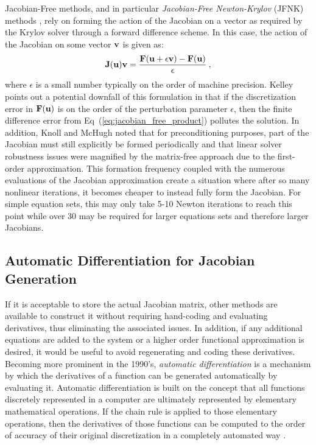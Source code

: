 Jacobian-Free methods, and in particular \textit{Jacobian-Free
  Newton-Krylov} (JFNK) methods \citep{knoll_jacobian-free_2004}, rely
on forming the action of the Jacobian on a vector as required by the
Krylov solver through a forward difference scheme. In this case, the
action of the Jacobian on some vector $\mathbf{v}$ is given as:
\begin{equation}
  \mathbf{J}(\mathbf{u})\mathbf{v} = \frac{\mathbf{F}(\mathbf{u} + \epsilon \mathbf{v}) -
    \mathbf{F}(\mathbf{u})}{\epsilon}\:,
  \label{eq:jacobian_free_product}
\end{equation}
where $\epsilon$ is a small number typically on the order of machine
precision. Kelley \citep{kelley_iterative_1995} points out a potential
downfall of this formulation in that if the discretization error in
$\mathbf{F}(\mathbf{u})$ is on the order of the perturbation parameter
$\epsilon$, then the finite difference error from
Eq~(\ref{eq:jacobian_free_product}) pollutes the solution. In
addition, Knoll and McHugh noted that for preconditioning purposes,
part of the Jacobian must still explicitly be formed periodically and
that linear solver robustness issues were magnified by the matrix-free
approach due to the first-order approximation. This formation
frequency coupled with the numerous evaluations of the Jacobian
approximation create a situation where after so many nonlinear
iterations, it becomes cheaper to instead fully form the
Jacobian. For simple equation sets, this may only take 5-10 Newton
iterations to reach this point while over 30 may be required for
larger equations sets and therefore larger Jacobians.

\subsection{Automatic Differentiation for Jacobian Generation}
\label{subsec:automatic_differentiation}
If it is acceptable to store the actual Jacobian matrix, other methods
are available to construct it without requiring hand-coding and
evaluating derivatives, thus eliminating the associated issues. In
addition, if any additional equations are added to the system or a
higher order functional approximation is desired, it would be useful
to avoid regenerating and coding these derivatives. Becoming more
prominent in the 1990's, \textit{automatic differentiation} is a
mechanism by which the derivatives of a function can be generated
automatically by evaluating it. Automatic differentiation is built on
the concept that all functions discretely represented in a computer
are ultimately represented by elementary mathematical operations. If
the chain rule is applied to those elementary operations, then the
derivatives of those functions can be computed to the order of
accuracy of their original discretization in a completely automated
way \citep{averick_computing_1994}.

